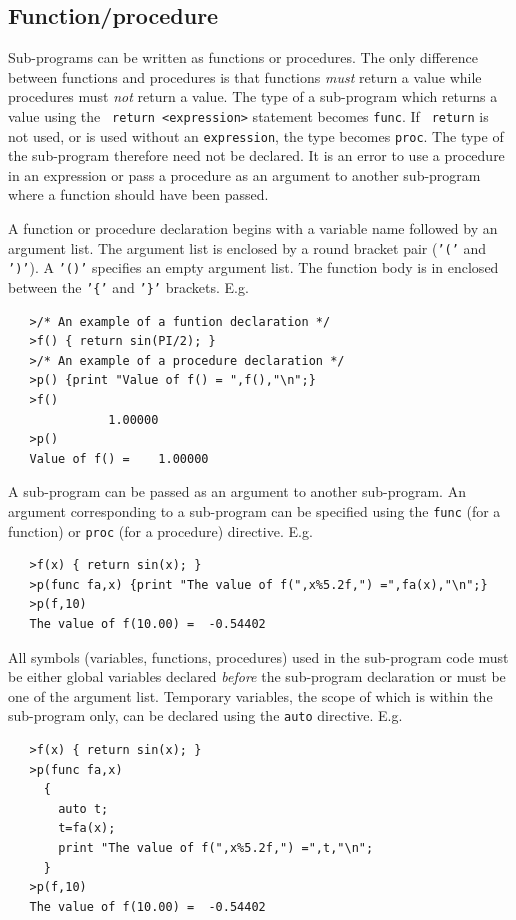 \documentclass[12pt]{article}
\begin{document}
\subsection{Function/procedure}
\label{APPEN:SYNTAX_FUNC}

Sub-programs can be written as functions or procedures.  The only
difference between functions and procedures is that functions {\it
must} return a value while procedures must {\it not} return a value.
The type of a sub-program which returns a value using the {\tt
return}~{\tt <expression>} statement becomes {\tt func}.  If {\tt
return} is not used, or is used without an {\tt expression}, the type
becomes {\tt proc}.  The type of the sub-program therefore need not be
declared.  It is an error to use a procedure in an expression or pass
a procedure as an argument to another sub-program where a function
should have been passed.

A function or procedure declaration begins with a variable name
followed by an argument list.  The argument list is enclosed by a
round bracket pair ({\tt '('} and {\tt ')'}).  A {\tt '()'} specifies
an empty argument list.  The function body is in enclosed between the
{\tt '\{'} and {\tt '\}'} brackets.  E.g.
\begin{verbatim}
   >/* An example of a funtion declaration */
   >f() { return sin(PI/2); }
   >/* An example of a procedure declaration */ 
   >p() {print "Value of f() = ",f(),"\n";}
   >f()
              1.00000
   >p() 
   Value of f() =    1.00000
\end{verbatim}
A sub-program can be passed as an argument to another sub-program.  An
argument corresponding to a sub-program can be specified using the
{\tt func} (for a function) or {\tt proc} (for a procedure) directive.
E.g.
\begin{verbatim}
   >f(x) { return sin(x); }
   >p(func fa,x) {print "The value of f(",x%5.2f,") =",fa(x),"\n";}
   >p(f,10)
   The value of f(10.00) =  -0.54402
\end{verbatim}
All symbols (variables, functions, procedures) used in the sub-program
code must be either global variables declared {\it before} the
sub-program declaration or must be one of the argument list.
Temporary variables, the scope of which is within the sub-program
only, can be declared using the {\tt auto} directive.  E.g.
\begin{verbatim}
   >f(x) { return sin(x); }
   >p(func fa,x)
     {
       auto t;
       t=fa(x);
       print "The value of f(",x%5.2f,") =",t,"\n";
     }
   >p(f,10)
   The value of f(10.00) =  -0.54402
\end{verbatim}
\end{document}
